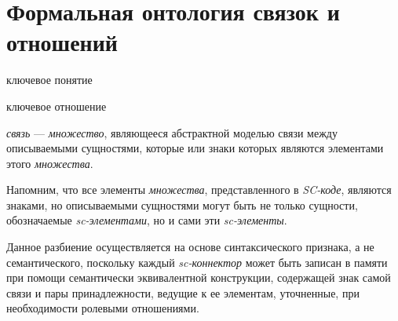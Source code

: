 \section{Формальная онтология связок и отношений}
\label{sec_top_ontologies_rel}

\begin{SCn}
\begin{scnrelfromlist}{ключевое понятие}
\end{scnrelfromlist}

\begin{scnrelfromlist}{ключевое отношение}
\end{scnrelfromlist}
\end{SCn}

\textit{связь} --- \textit{множество}, являющееся абстрактной моделью связи между описываемыми сущностями, которые или знаки которых являются элементами этого \textit{множества}.

Напомним, что все элементы \textit{множества}, представленного в \textit{SC-коде}, являются знаками, но описываемыми сущностями могут быть не только сущности, обозначаемые \textit{sc-элементами}, но и сами эти \textit{sc-элементы}.

\begin{SCn}
\begin{scnsubdividing}
\end{scnsubdividing}

\begin{scnsubdividing}
\end{scnsubdividing}
	
\begin{scnsubdividing}
\end{scnsubdividing}
\end{SCn}

Данное разбиение осуществляется на основе синтаксического признака, а не семантического, поскольку каждый \textit{sc-коннектор} может быть записан в памяти при помощи семантически эквивалентной конструкции, содержащей знак самой связи и пары принадлежности, ведущие к ее элементам, уточненные, при необходимости ролевыми отношениями.

